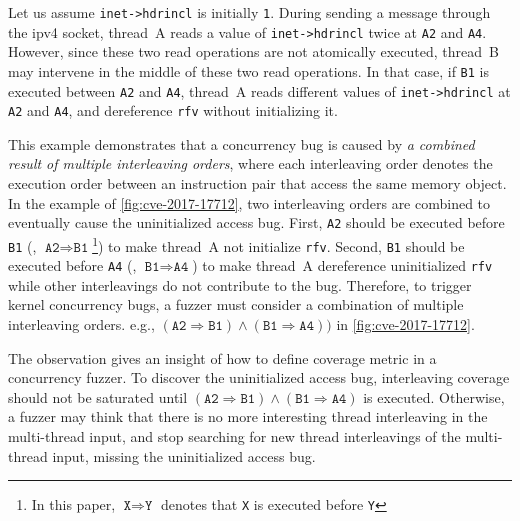 Let us assume \texttt{inet->hdrincl} is initially \texttt{1}.
%
During sending a message through the ipv4 socket, thread~A reads a
value of \texttt{inet->hdrincl} twice at \texttt{A2} and \texttt{A4}.
%
However, since these two read operations are not atomically executed,
thread~B may intervene in the middle of these two read operations.
%
In that case, if \texttt{B1} is executed between \texttt{A2} and
\texttt{A4}, thread~A reads different values of \texttt{inet->hdrincl}
at \texttt{A2} and \texttt{A4}, and dereference \texttt{rfv} without
initializing it.


%
This example demonstrates that a concurrency bug is caused by \textit{a combined
  result of multiple interleaving orders}, where each interleaving order
denotes the execution order between an instruction pair that access
the same memory object.
%
In the example of \autoref{fig:cve-2017-17712}, two interleaving orders
are combined to eventually cause the uninitialized access bug.
%
First, \texttt{A2} should be executed before \texttt{B1} (\ie,
$\texttt{A2} \Rightarrow \texttt{B1}$\footnote{In this paper,
  $\texttt{X} \Rightarrow \texttt{Y}$ denotes that \texttt{X} is
  executed before \texttt{Y}}) to make thread~A not initialize
\texttt{rfv}.
%
Second, \texttt{B1} should be executed before \texttt{A4} (\ie,
$\texttt{B1} \Rightarrow \texttt{A4}$) to make thread~A dereference
uninitialized \texttt{rfv} while other interleavings do not 
contribute to the bug.
%
Therefore, to trigger kernel concurrency bugs, a fuzzer must 
consider a combination of multiple interleaving orders. e.g.,
$(\texttt{A2} \Rightarrow \texttt{B1}) \wedge (\texttt{B1} \Rightarrow
\texttt{A4}))$ in \autoref{fig:cve-2017-17712}.


The observation gives an insight of how to define coverage metric 
in a concurrency fuzzer.
To discover the uninitialized access bug, 
interleaving coverage should not be saturated until
$(\texttt{A2} \Rightarrow \texttt{B1}) \wedge (\texttt{B1} \Rightarrow
\texttt{A4})$ is executed.
%
Otherwise, a fuzzer may think that there is no more interesting thread
interleaving in the multi-thread input, and stop searching for new
thread interleavings of the multi-thread input, missing the
uninitialized access bug.


